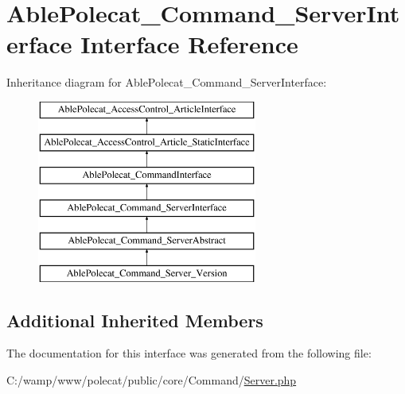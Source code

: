 \hypertarget{interface_able_polecat___command___server_interface}{}\section{Able\+Polecat\+\_\+\+Command\+\_\+\+Server\+Interface Interface Reference}
\label{interface_able_polecat___command___server_interface}
Inheritance diagram for Able\+Polecat\+\_\+\+Command\+\_\+\+Server\+Interface\+:\begin{figure}[H]
\begin{center}
\leavevmode
\includegraphics[height=6.000000cm]{interface_able_polecat___command___server_interface}
\end{center}
\end{figure}
\subsection*{Additional Inherited Members}


The documentation for this interface was generated from the following file\+:\begin{DoxyCompactItemize}
\item 
C\+:/wamp/www/polecat/public/core/\+Command/\hyperlink{_command_2_server_8php}{Server.\+php}\end{DoxyCompactItemize}
